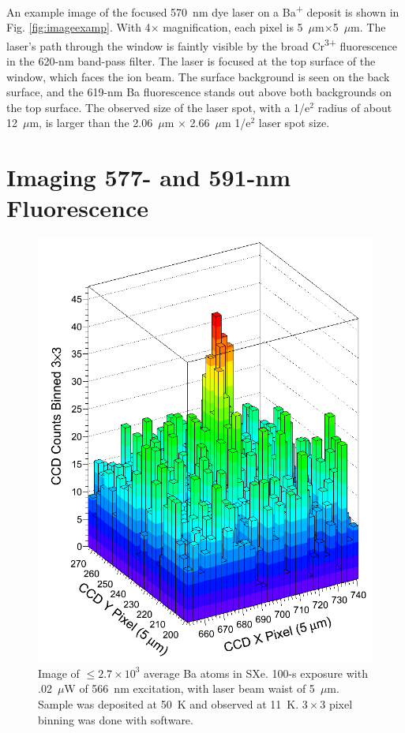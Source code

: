 An example image of the focused 570~nm dye laser on a Ba\textsuperscript{+} deposit is shown in Fig. \ref{fig:imageexamp}.  With 4$\times$ magnification, each pixel is 5~$\mu$m$\times$5~$\mu$m.  The laser's path through the window is faintly visible by the broad Cr\textsuperscript{3+} fluorescence in the 620-nm band-pass filter.  The laser is focused at the top surface of the window, which faces the ion beam.  The surface background is seen on the back surface, and the 619-nm Ba fluorescence stands out above both backgrounds on the top surface.  The observed size of the laser spot, with a 1/e$^{2}$ radius of about 12~$\mu$m, is larger than the 2.06~$\mu$m $\times$ 2.66~$\mu$m 1/e$^{2}$ laser spot size.




\section{Imaging 577- and 591-nm Fluorescence}
\label{sec:imaging590and577}

\begin{figure} %
        \centering
                \includegraphics[width=.6\textwidth]{figures/image_1e4.png}
                \caption{Image of $\leq 2.7 \times 10^{3}$ average Ba atoms in SXe.  100-s exposure with .02~$\mu$W of 566~nm excitation, with laser beam waist of 5~$\mu$m.  Sample was deposited at 50~K and observed at 11~K.  $3 \times 3$ pixel binning was done with software.}
\label{fig:image590s}
\end{figure}

